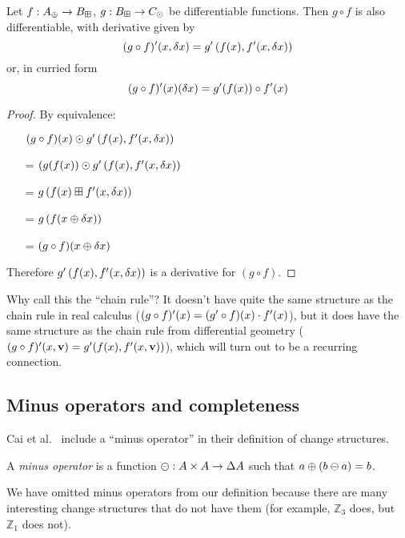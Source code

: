 \begin{thm}
  Let $f: A_\oplus \rightarrow B_\boxplus$, $g: B_\boxplus \rightarrow C_\odot$ be differentiable functions. Then $g \circ f$ is also
  differentiable, with derivative given by
   $$(g \circ f)'(x, \delta x) = g'\left(f(x), f'(x, \delta x)\right)$$
   or, in curried form
   $$(g \circ f)'(x)(\delta x) = g'(f(x)) \circ f'(x)$$
\end{thm}
\begin{proof}
  By equivalence:
  \begin{itemize}
    \item[ ]$(g \circ f)(x) \odot g'\left(f(x), f'(x,\delta x)\right)$
    \item[=]$(g(f(x)) \odot g'\left(f(x), f'(x,\delta x)\right)$
    \item[=]$g\left(f(x) \boxplus f'(x, \delta x) \right)$
    \item[=]$g\left(f(x \oplus \delta x)\right)$
    \item[=]$(g \circ f)(x \oplus \delta x)$
  \end{itemize}
  Therefore $g'\left(f(x), f'(x, \delta x)\right)$ is a
  derivative for $(g \circ f)$.
\end{proof}

Why call this the ``chain rule''? It doesn't have quite the same structure as
the chain rule in real calculus ($(g \circ f)'(x) = (g' \circ f)
(x) \cdot f'(x)$), but it does have the same structure as the chain rule
from differential geometry ($(g \circ f)'(x, \textbf{v}) = g'
(f(x), f'(x, \textbf{v}))$), which will turn out to be a recurring connection.

\subsection{Minus operators and completeness}

Cai et al.~\cite{cai2014changes} include a ``minus operator'' in their definition of change structures. 

\begin{defn}
  A \textit{minus operator} is a function $\ominus: A \times A \rightarrow \Delta A$ such that $a \oplus (b \ominus a) = b$.
\end{defn}

We have omitted minus operators from our definition because
there are many interesting change structures that do not have them (for example,
$\mathbb{Z}_3$ does, but $\mathbb{Z}_1$ does not).

